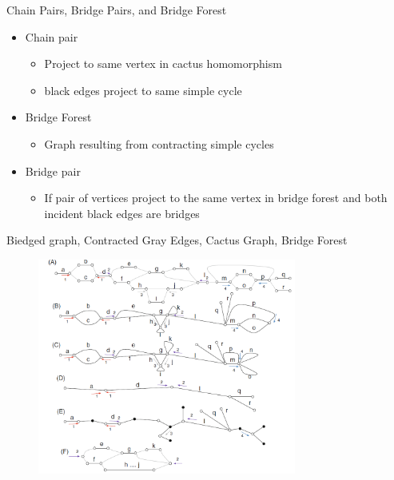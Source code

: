 \documentclass{beamer}
\begin{document}
\begin{frame}{Chain Pairs, Bridge Pairs, and Bridge Forest}
    \begin{itemize}
        \item Chain pair
        \begin{itemize}
            \item Project to same vertex in cactus homomorphism
            \item black edges project to same simple cycle
        \end{itemize}
        \item Bridge Forest
        \begin{itemize}
            \item Graph resulting from contracting simple cycles
        \end{itemize}
        \item Bridge pair
        \begin{itemize}
            \item If pair of vertices project to the same vertex in bridge forest  and both incident black edges are bridges
        \end{itemize}
    \end{itemize}
    
\end{frame}
\begin{frame}{Biedged graph, Contracted Gray Edges, Cactus Graph, Bridge Forest}
\begin{figure}[H]
\centering
\includegraphics[width=85mm]{CactusBridgeForest.png}
\end{figure}
\end{frame}
\end{document}
